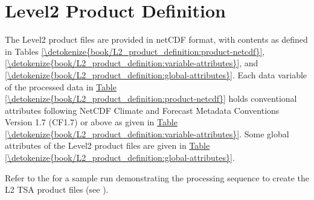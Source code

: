 \documentclass[letterpaper,10pt,english]{jupyterBook}
\begin{document}
\sphinxstepscope


\chapter{Level\sphinxhyphen{}2 Product Definition}
\label{\detokenize{book/L2_product_definition:level-2-product-definition}}\label{\detokenize{book/L2_product_definition::doc}}
\sphinxAtStartPar
The Level\sphinxhyphen{}2 {\hyperref[\detokenize{book/acronyms:term-TSA}]{}} product files are provided in netCDF format, with contents as defined in Tables \hyperref[\detokenize{book/L2_product_definition:product-netcdf}]{\ref{\detokenize{book/L2_product_definition:product-netcdf}}}, \hyperref[\detokenize{book/L2_product_definition:variable-attributes}]{\ref{\detokenize{book/L2_product_definition:variable-attributes}}}, and \hyperref[\detokenize{book/L2_product_definition:global-attributes}]{\ref{\detokenize{book/L2_product_definition:global-attributes}}}.
Each data variable of the processed data in \hyperref[\detokenize{book/L2_product_definition:product-netcdf}]{Table \ref{\detokenize{book/L2_product_definition:product-netcdf}}} holds conventional attributes following NetCDF Climate and Forecast Metadata Conventions Version 1.7 (CF\sphinxhyphen{}1.7) or above as given in \hyperref[\detokenize{book/L2_product_definition:variable-attributes}]{Table \ref{\detokenize{book/L2_product_definition:variable-attributes}}}.
Some global attributes of the Level\sphinxhyphen{}2 product files are given in \hyperref[\detokenize{book/L2_product_definition:global-attributes}]{Table \ref{\detokenize{book/L2_product_definition:global-attributes}}}.


\nopagebreak


\sphinxAtStartPar
Refer to the {\hyperref[\detokenize{book/annex:content-annex}]{}} for a sample run demonstrating the processing sequence to create the L2 TSA product files (see {\hyperref[\detokenize{algorithm/CIMR_L2_TSA_PICASSO::doc}]{}}).
\end{document}
